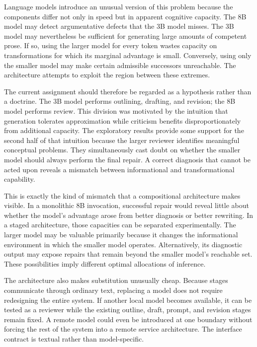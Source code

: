 \documentclass[11pt]{article}
\begin{document}
Language models introduce an unusual version of this problem because the components differ not only in speed but in apparent cognitive capacity. The 8B model may detect argumentative defects that the 3B model misses. The 3B model may nevertheless be sufficient for generating large amounts of competent prose. If so, using the larger model for every token wastes capacity on transformations for which its marginal advantage is small. Conversely, using only the smaller model may make certain admissible successors unreachable. The architecture attempts to exploit the region between these extremes.

The current assignment should therefore be regarded as a hypothesis rather than a doctrine. The 3B model performs outlining, drafting, and revision; the 8B model performs review. This division was motivated by the intuition that generation tolerates approximation while criticism benefits disproportionately from additional capacity. The exploratory results provide some support for the second half of that intuition because the larger reviewer identifies meaningful conceptual problems. They simultaneously cast doubt on whether the smaller model should always perform the final repair. A correct diagnosis that cannot be acted upon reveals a mismatch between informational and transformational capability.

This is exactly the kind of mismatch that a compositional architecture makes visible. In a monolithic 8B invocation, successful repair would reveal little about whether the model's advantage arose from better diagnosis or better rewriting. In a staged architecture, those capacities can be separated experimentally. The larger model may be valuable primarily because it changes the informational environment in which the smaller model operates. Alternatively, its diagnostic output may expose repairs that remain beyond the smaller model's reachable set. These possibilities imply different optimal allocations of inference.

The architecture also makes substitution unusually cheap. Because stages communicate through ordinary text, replacing a model does not require redesigning the entire system. If another local model becomes available, it can be tested as a reviewer while the existing outline, draft, prompt, and revision stages remain fixed. A remote model could even be introduced at one boundary without forcing the rest of the system into a remote service architecture. The interface contract is textual rather than model-specific.
\end{document}
